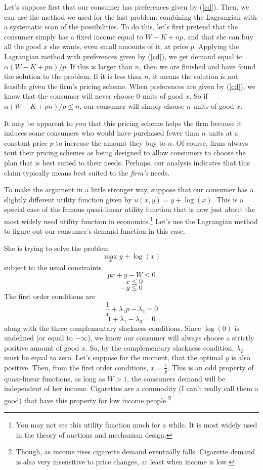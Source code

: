 \documentclass[12pt]{article}
\newcommand{\tmem}[1]{{\em #1\/}}
\begin{document}
Let's suppose first that our consumer has preferences given by (\ref{cd}). Then,
we can use the method we used for the last problem: combining the Lagrangian
with a systematic scan of the possibilities. To do this, let's first pretend
that the consumer simply has a fixed income equal to $W - K + n p$, and that
she can buy all the good $x$ she wants, even small amounts of it, at price
$p$. Applying the Lagrangian method with preferences given by (\ref{cd}), we
get demand equal to $\alpha ( W - K + p n ) / p$. If this is larger than $n$,
then we are finished and have found the solution to the problem. If it is less
than $n$, it means the solution is not feasible given the firm's pricing
scheme. When preferences are given by (\ref{cd}), we know that the consumer
will never choose $0$ units of good $x$. So if $\alpha ( W - K + p n ) / p
\leqslant n$, our consumer will simply choose $n$ units of good $x$.

It may be apparent to you that this pricing scheme helps the firm because it
induces some consumers who would have purchased fewer than $n$ units at a
constant price $p$ to increase the amount they buy to $n$. Of course, firms
always tout their pricing schemes as being designed to allow consumers to
choose the plan that is best suited to their needs. Perhaps, our analysis indicates
that this claim typically means best suited to the {\tmem{firm's}} needs.

To make the argument in a little stronger way, suppose that our consumer has a
slightly different utility function given by $u ( x, y ) = y + \log ( x )$.
This is a special case of the famous quasi-linear utility function that is now
just about the most widely used utility function in economics.{\footnote{You
may not see this utility function much for a while. It is most widely used in
the theory of auctions and mechanism design.}} Let's use the Lagrangian method
to figure out our consumer's demand function in this case.

She is trying to solve the problem
\[ \max_x y + \log ( x ) \]
subject to the usual constraints
\[ p x + y - W \leqslant 0 \]
\[ - x \leqslant 0 \]
\[ - y \leqslant 0 \]
The first order conditions are
\[ \frac{1}{x} + \lambda_1 p - \lambda_2 = 0 \]
\[ 1 + \lambda_1 - \lambda_3 = 0 \]
along with the three complementary slackness conditions. Since $\log ( 0 )$ is
undefined (or equal to $- \infty$), we know our consumer will always choose a
strictly positive amount of good $x$. So, by the complementary slackness
condition, $\lambda_2$ must be equal to zero. Let's suppose for the moment,
that the optimal $y$ is also positive. Then, from the first order conditions,
$x = \frac{1}{p}$. This is an odd property of quasi-linear functions, as long
as $W > 1$, the consumers demand will be independent of her income. Cigarettes
are a commodity (I can't really call them a good) that have this property for
low income people.{\footnote{Though, as income rises cigarette demand eventually
falls. Cigarette demand is also very insensitive to price changes, at least
when income is low.}}
\end{document}
